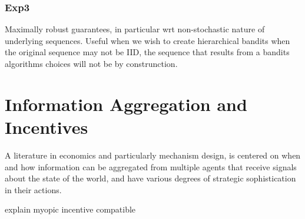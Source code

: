 \subsubsection{Exp3}

 Maximally robust guarantees, in particular wrt non-stochastic nature of underlying sequences. Useful when we wish to create hierarchical bandits when the original sequence may not be IID, the sequence that results from a bandits algorithms choices will not be by construnction.


\section{Information Aggregation and Incentives}

A literature in economics and particularly mechanism design, is centered on when and how information can be aggregated from multiple agents that receive signals about the state of the world, and have various degrees of strategic sophistication in their actions.

explain myopic incentive compatible




